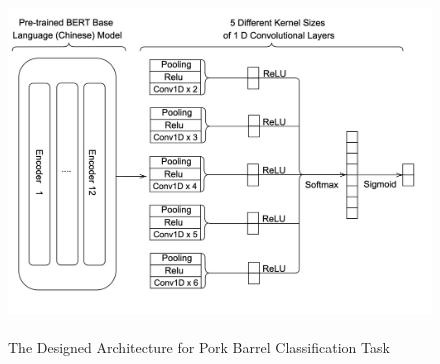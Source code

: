 \begin{figure}[htbp]
    \centering
    \includegraphics[width = 14.5cm, height=9.1cm]{03-Chapter-Three/image/framework.png}
    \caption{The Designed Architecture for Pork Barrel Classification Task}
    \label{fig:bert}
    \begin{tablenotes}
    \end{tablenotes}
\end{figure}